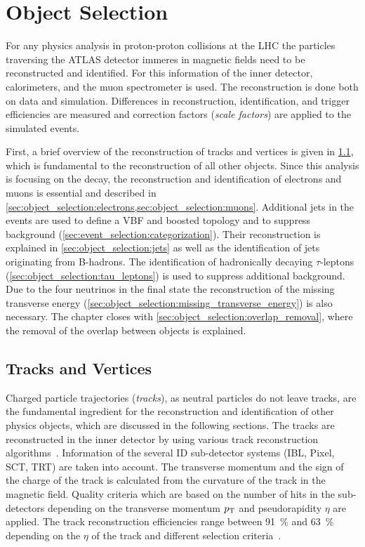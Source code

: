 \chapter{Object Selection}\label{cha:object_selection}

For any physics analysis in proton-proton collisions at the LHC the particles traversing the ATLAS detector
immeres in magnetic fields
need to be reconstructed and identified.
For this information of the inner detector, calorimeters, and the muon spectrometer is used.
The reconstruction is done both on data and simulation. Differences in reconstruction, identification, and trigger efficiencies are
measured and correction factors (\emph{scale factors}) are applied to the simulated events.

First, a brief overview of the reconstruction of tracks and vertices is given in \cref{sec:object_selection:tracks_and_vertices}, which
is fundamental to the reconstruction of all other objects.
Since this analysis is focusing on the \Httllfull{} decay, the reconstruction and identification of electrons and muons
is essential and described in \cref{sec:object_selection:electrons,sec:object_selection:muons}.
Additional jets in the events are used to define a VBF and boosted topology and to suppress background (\cref{sec:event_selection:categorization}).
Their reconstruction is explained in \cref{sec:object_selection:jets} as well as the identification of jets originating from B-hadrons.
The identification of hadronically decaying $\tau$-leptons (\cref{sec:object_selection:tau_leptons}) is used to suppress additional background.
Due to the four neutrinos in the final state the reconstruction of the missing transverse energy (\cref{sec:object_selection:missing_transverse_energy})
is also necessary.
The chapter closes with \cref{sec:object_selection:overlap_removal}, where the removal of the overlap between objects is explained.

\section{Tracks and Vertices}\label{sec:object_selection:tracks_and_vertices}

Charged particle trajectories (\emph{tracks}), as neutral particles do not leave tracks, are the fundamental ingredient for the reconstruction and identification
of other physics objects, which are discussed in the following sections.
The tracks are reconstructed in the inner detector by using various track reconstruction algorithms~\cite{ATL-SOFT-PUB-2007-007}.
Information of the several ID sub-detector systems (IBL, Pixel, SCT, TRT) are taken into account.
The transverse momentum and the sign of the charge of the track is calculated from the curvature of the track in the magnetic field.
Quality criteria which are based on the number of hits in the sub-detectors depending on the transverse momentum $p_\text{T}$ and pseudorapidity $\eta$
are applied.
The track reconstruction efficiencies range between \SI{91}{\percent} and \SI{63}{\percent} depending on the $\eta$ of the track and different selection criteria~\cite{ATL-PHYS-PUB-2015-051}.

